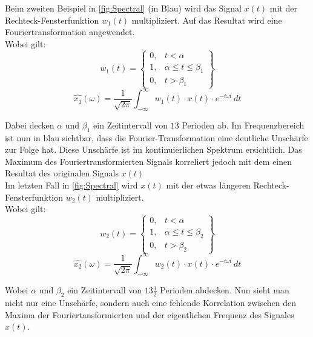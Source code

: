 Beim zweiten Beispiel in \ref{fig:Spectral} (in Blau) wird das Signal $x(t)$ mit der Rechteck-Fensterfunktion $w_{1}(t)$ multipliziert. Auf das Resultat wird eine Fouriertransformation angewendet.\\
Wobei gilt: 
\begin{equation}
	w_{1}(t)= \left\{\begin{array}{lll}{0,} & {t<\alpha}  \\ {1,}&{\alpha\leq t \leq\beta_{1}} \\ {0,} &{t>\beta_{1}}\end{array}\right\}
\end{equation}
\begin{equation}
	\hat{x_{1}}(\omega)=\frac{1}{\sqrt{2 \pi}} \int_{-\infty}^{\infty} w_{1}(t)\cdot x(t) \cdot e^{-i \omega t} \,dt
\end{equation}

Dabei decken $\alpha$ und $\beta_{1}$ ein Zeitintervall von $13$ Perioden ab. Im Frequenzbereich ist nun in blau sichtbar, dass die Fourier-Transformation eine deutliche Unschärfe zur Folge hat. Diese Unschärfe ist im kontinuierlichen Spektrum ersichtlich. Das Maximum des Fouriertransformierten Signals korreliert jedoch mit dem einen Resultat des originalen Signals $x(t)$\\




Im letzten Fall in \ref{fig:Spectral} wird $x(t)$ mit der etwas längeren Rechteck-Fensterfunktion $w_{2}(t)$ multipliziert.\\
Wobei gilt: 
\begin{equation}
	w_{2}(t)= \left\{\begin{array}{lll}{0,}&{t<\alpha}  \\ {1,}&{\alpha\leq t \leq\beta_{2}} \\ {0,}&{t>\beta_{2}}\end{array}\right\}
\end{equation}
\begin{equation}
	\hat{x_{2}}(\omega)=\frac{1}{\sqrt{2 \pi}} \int_{-\infty}^{\infty} w_{2}(t)\cdot x(t) \cdot e^{-i \omega t} \,dt
\end{equation}

Wobei $\alpha$ und $\beta_{2}$ ein Zeitintervall von $13\frac{1}{2}$ Perioden abdecken. Nun sieht man nicht nur eine Unschärfe, sondern auch eine fehlende Korrelation zwischen den Maxima der Fouriertansformierten und der eigentlichen Frequenz des Signales $x(t)$.\\

